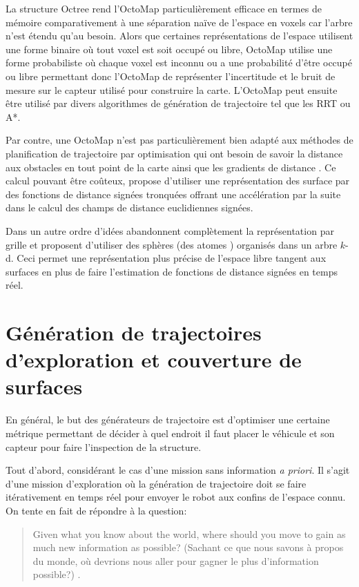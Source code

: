 La structure Octree rend l'OctoMap particulièrement efficace en termes de mémoire comparativement à une séparation naïve de l'espace en voxels car l'arbre n'est étendu qu'au besoin. Alors que certaines représentations de l'espace utilisent une forme binaire où tout voxel est soit occupé ou libre, OctoMap utilise une forme probabiliste où chaque voxel est inconnu ou a une probabilité d'être occupé ou libre permettant donc l'OctoMap de représenter l'incertitude et le bruit de mesure sur le capteur utilisé pour construire la carte. L'OctoMap peut ensuite être utilisé par divers algorithmes de génération de trajectoire tel que les RRT ou A*.

Par contre, une OctoMap n'est pas particulièrement bien adapté aux méthodes de planification de trajectoire par optimisation qui ont besoin de savoir la distance aux obstacles en tout point de la carte ainsi que les gradients de distance \citep{ratliff2009chomp, Oleynikova2016}. Ce calcul pouvant être coûteux, \cite{oleynikova2017voxblox} propose d'utiliser une représentation des surface par des fonctions de distance signées tronquées offrant une accélération par la suite dans le calcul des champs de distance euclidiennes signées.

Dans un autre ordre d'idées \cite{Fridovich-Keil2017AtomMap} abandonnent complètement la représentation par grille et proposent d'utiliser des sphères (des \guillemotleft atomes \guillemotright) organisés dans un arbre $k$-d. Ceci permet une représentation plus précise de l'espace libre tangent aux surfaces en plus de faire l'estimation de fonctions de distance signées en temps réel.

\section{Génération de trajectoires d'exploration et couverture de surfaces}\label{subsec:generation}

En général, le but des générateurs de trajectoire est d'optimiser une certaine métrique permettant de décider à quel endroit il faut placer le véhicule et son capteur pour faire l'inspection de la structure.

Tout d'abord, considérant le cas d'une mission sans information \textit{a priori}. Il s'agit d'une mission d'exploration où la génération de trajectoire doit se faire itérativement en temps réel pour envoyer le robot aux confins de l'espace connu. On tente en fait de répondre à la question:

\begin{quote}
  Given what you know about the world, where should you move to gain as much new information as possible? (Sachant ce que nous savons à propos du monde, où devrions nous aller pour gagner le plus d'information possible?) \citep{Yamauchi1997}.
\end{quote}

